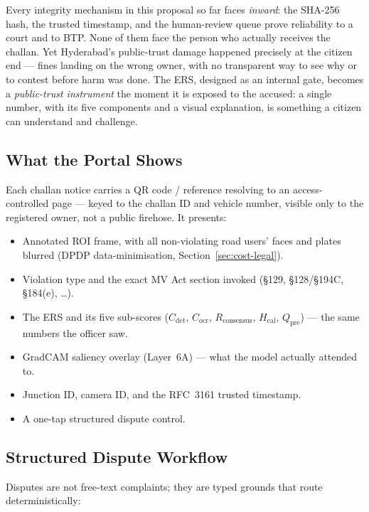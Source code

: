 \documentclass[11pt,a4paper]{article}
\begin{document}
Every integrity mechanism in this proposal so far faces \emph{inward}: the SHA-256 hash, the trusted timestamp, and the human-review queue prove reliability to a court and to BTP. None of them face the person who actually receives the challan. Yet Hyderabad's public-trust damage happened precisely at the citizen end --- fines landing on the wrong owner, with no transparent way to see why or to contest before harm was done. The ERS, designed as an internal gate, becomes a \emph{public-trust instrument} the moment it is exposed to the accused: a single number, with its five components and a visual explanation, is something a citizen can understand and challenge.

\subsection*{What the Portal Shows}

Each challan notice carries a QR code / reference resolving to an access-controlled page --- keyed to the challan ID and vehicle number, visible only to the registered owner, not a public firehose. It presents:

\begin{itemize}[leftmargin=1.8em, itemsep=0.2em]
    \item Annotated ROI frame, with all non-violating road users' faces and plates blurred (DPDP data-minimisation, Section~\ref{sec:cost-legal}).
    \item Violation type and the exact MV Act section invoked (\S129, \S128/\S194C, \S184(e), \dots).
    \item The ERS and its five sub-scores ($C_{\text{det}}$, $C_{\text{ocr}}$, $R_{\text{consensus}}$, $H_{\text{cal}}$, $Q_{\text{pre}}$) --- the same numbers the officer saw.
    \item GradCAM saliency overlay (Layer~6A) --- what the model actually attended to.
    \item Junction ID, camera ID, and the RFC~3161 trusted timestamp.
    \item A one-tap structured dispute control.
\end{itemize}

\subsection*{Structured Dispute Workflow}

Disputes are not free-text complaints; they are typed grounds that route deterministically:
\end{document}
